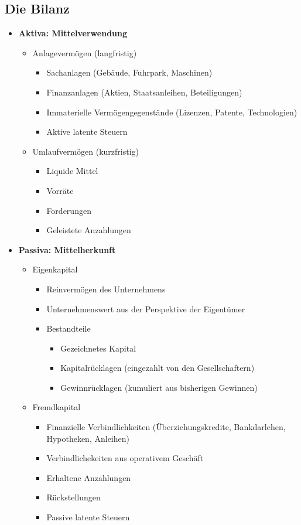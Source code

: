 \subsection{Die Bilanz}
\begin{itemize}
	\item \textbf{Aktiva: Mittelverwendung}
	\begin{itemize}
		\item Anlagevermögen (langfristig)
		\begin{itemize}
			\item Sachanlagen (Gebäude, Fuhrpark, Maschinen)
			\item Finanzanlagen (Aktien, Staatsanleihen, Beteiligungen)
			\item Immaterielle Vermögengegenstände (Lizenzen, Patente, Technologien)
			\item Aktive latente Steuern
		\end{itemize}
		\item Umlaufvermögen (kurzfristig)
		\begin{itemize}
			\item Liquide Mittel
			\item Vorräte
			\item Forderungen
			\item Geleistete Anzahlungen
		\end{itemize}
	\end{itemize}
	\item \textbf{Passiva: Mittelherkunft}
	\begin{itemize}
		\item Eigenkapital
		\begin{itemize}
			\item Reinvermögen des Unternehmens
			\item Unternehmenswert aus der Perspektive der Eigentümer
			\item Bestandteile
			\begin{itemize}
				\item Gezeichnetes Kapital
				\item Kapitalrücklagen (eingezahlt von den Gesellschaftern)
				\item Gewinnrücklagen (kumuliert aus bisherigen Gewinnen)
			\end{itemize}
		\end{itemize}
		\item Fremdkapital
		\begin{itemize}
			\item Finanzielle Verbindlichkeiten (Überziehungskredite, Bankdarlehen, Hypotheken, Anleihen)
			\item Verbindlichekeiten aus operativem Geschäft
			\item Erhaltene Anzahlungen
			\item Rückstellungen
			\item Passive latente Steuern
		\end{itemize}
	\end{itemize}
\end{itemize}


